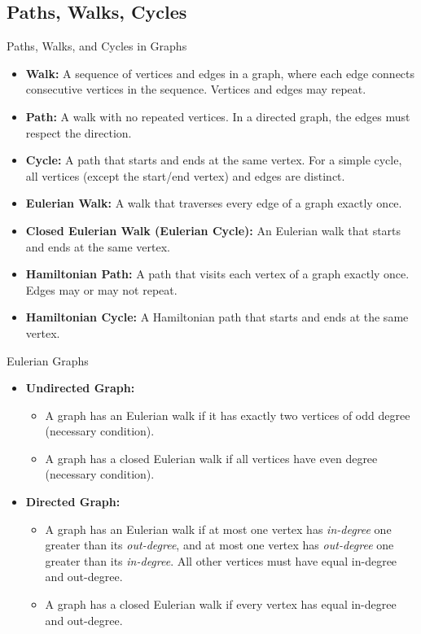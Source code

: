 \newpage
\subsection{Paths, Walks, Cycles}
\begin{definition}[]{Paths, Walks, and Cycles in Graphs}
    \begin{itemize}
        \item \textbf{Walk:} A sequence of vertices and edges in a graph, where each edge connects consecutive vertices in the sequence. Vertices and edges may repeat.
        \item \textbf{Path:} A walk with no repeated vertices. In a directed graph, the edges must respect the direction.
        \item \textbf{Cycle:} A path that starts and ends at the same vertex. For a simple cycle, all vertices (except the start/end vertex) and edges are distinct.
        \item \textbf{Eulerian Walk:} A walk that traverses every edge of a graph exactly once.
        \item \textbf{Closed Eulerian Walk (Eulerian Cycle):} An Eulerian walk that starts and ends at the same vertex.
        \item \textbf{Hamiltonian Path:} A path that visits each vertex of a graph exactly once. Edges may or may not repeat.
        \item \textbf{Hamiltonian Cycle:} A Hamiltonian path that starts and ends at the same vertex.
    \end{itemize}
\end{definition}

\begin{properties}[]{Eulerian Graphs}
    \begin{itemize}
        \item \textbf{Undirected Graph:}
              \begin{itemize}
                  \item A graph has an Eulerian walk if it has exactly two vertices of odd degree (necessary condition).
                  \item A graph has a closed Eulerian walk if all vertices have even degree (necessary condition).
              \end{itemize}
        \item \textbf{Directed Graph:}
              \begin{itemize}
                  \item A graph has an Eulerian walk if at most one vertex has \textit{in-degree} one greater than its \textit{out-degree}, and at most one vertex has \textit{out-degree} one greater than its \textit{in-degree}. All other vertices must have equal in-degree and out-degree.
                  \item A graph has a closed Eulerian walk if every vertex has equal in-degree and out-degree.
              \end{itemize}
    \end{itemize}
\end{properties}

